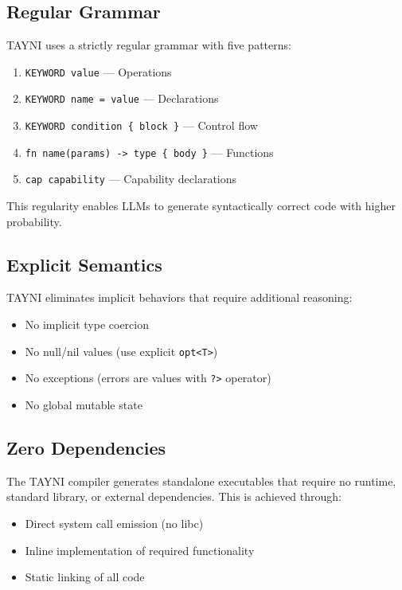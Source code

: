 \documentclass[11pt,a4paper]{article}
\begin{document}
\subsection{Regular Grammar}

TAYNI uses a strictly regular grammar with five patterns:
\begin{enumerate}
    \item \texttt{KEYWORD value} — Operations
    \item \texttt{KEYWORD name = value} — Declarations
    \item \texttt{KEYWORD condition \{ block \}} — Control flow
    \item \texttt{fn name(params) -> type \{ body \}} — Functions
    \item \texttt{cap capability} — Capability declarations
\end{enumerate}

This regularity enables LLMs to generate syntactically correct code with higher probability.

\subsection{Explicit Semantics}

TAYNI eliminates implicit behaviors that require additional reasoning:
\begin{itemize}
    \item No implicit type coercion
    \item No null/nil values (use explicit \texttt{opt<T>})
    \item No exceptions (errors are values with \texttt{?>} operator)
    \item No global mutable state
\end{itemize}

\subsection{Zero Dependencies}

The TAYNI compiler generates standalone executables that require no runtime, standard library, or external dependencies. This is achieved through:
\begin{itemize}
    \item Direct system call emission (no libc)
    \item Inline implementation of required functionality
    \item Static linking of all code
\end{itemize}
\end{document}
